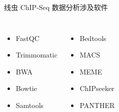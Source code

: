 \documentclass{beamer}
\begin{document}
	\begin{frame}{线虫 ChIP-Seq 数据分析}{涉及软件}
		\begin{columns}
			\begin{itemize}
				\item FastQC
				\item Trimmomatic
				\item BWA
				\item Bowtie
				\item Samtools
			\end{itemize}
			
			\begin{itemize}
				\item Bedtools
				\item MACS
				\item MEME
				\item ChIPseeker
				\item PANTHER
			\end{itemize}
		\end{columns}
	\end{frame}
	
\end{document}
